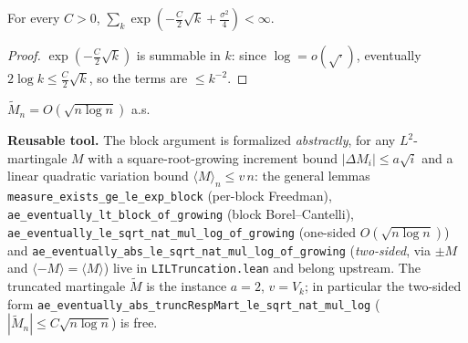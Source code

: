 \begin{lemma}\label{lem:trunc_block_summable}
\leanok
For every $C>0$, $\sum_k \exp(-\tfrac C2\sqrt k+\tfrac{\sigma^2}4)<\infty$.
\end{lemma}
\begin{proof}\leanok
$\exp(-\tfrac C2\sqrt k)$ is summable in $k$: since $\log=o(\sqrt\cdot)$, eventually
$2\log k\le \tfrac C2\sqrt k$, so the terms are $\le k^{-2}$.
\end{proof}

\begin{lemma}\label{lem:trunc_mart_lil}
\leanok
{}
$\tilde M_n=O(\sqrt{n\log n})$ a.s.

\textbf{Reusable tool.} The block argument is formalized \emph{abstractly}, for any $L^2$-martingale
$M$ with a square-root-growing increment bound $|\Delta M_i|\le a\sqrt i$ and a linear quadratic
variation bound $\langle M\rangle_n\le v\,n$: the general lemmas
\texttt{measure\_exists\_ge\_le\_exp\_block} (per-block Freedman),
\texttt{ae\_eventually\_lt\_block\_of\_growing} (block Borel--Cantelli),
\texttt{ae\_eventually\_le\_sqrt\_nat\_mul\_log\_of\_growing} (one-sided $O(\sqrt{n\log n})$) and
\texttt{ae\_eventually\_abs\_le\_sqrt\_nat\_mul\_log\_of\_growing} (\emph{two-sided}, via $\pm M$ and
$\langle -M\rangle=\langle M\rangle$) live in \texttt{LILTruncation.lean} and belong upstream. The
truncated martingale $\tilde M$ is the instance $a=2$, $v=V_k$; in particular the two-sided form
\texttt{ae\_eventually\_abs\_truncRespMart\_le\_sqrt\_nat\_mul\_log} ($|\tilde M_n|\le
C\sqrt{n\log n}$) is free.
\end{lemma}
